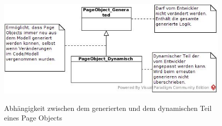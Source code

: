 \begin{figure}[htb]
  \centering  
  \includegraphics[scale=0.6]{img/postruktur.jpg}\\
  \caption{Abhängigkeit zwischen dem generierten und dem dynamischen Teil eines Page Objects}
  \label{fig:postruktur}
\end{figure}
 
